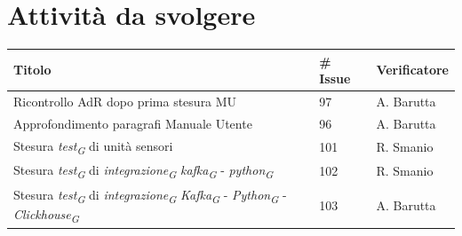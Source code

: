 \documentclass{article}
\begin{document}
    \section{Attività da svolgere}
    \begin{center}
        \begin{tabular}{|C{7cm}|C{1,5cm}|C{3cm}|}
            \hline
            \textbf{Titolo} & \textbf{\# Issue} & \textbf{Verificatore} \\
            \hline\hline
            Ricontrollo AdR dopo prima stesura MU & 97 & A. Barutta \\
            \hline
            Approfondimento paragrafi Manuale Utente & 96 & A. Barutta \\
            \hline
            Stesura \textit{test}\textsubscript{\textit{G}} di unità sensori & 101 & R. Smanio \\
            \hline
            Stesura \textit{test}\textsubscript{\textit{G}} di \textit{integrazione}\textsubscript{\textit{G}} \textit{kafka}\textsubscript{\textit{G}} - \textit{python}\textsubscript{\textit{G}} & 102 & R. Smanio \\
            \hline
            Stesura \textit{test}\textsubscript{\textit{G}} di \textit{integrazione}\textsubscript{\textit{G}} \textit{Kafka}\textsubscript{\textit{G}} - \textit{Python}\textsubscript{\textit{G}} - \textit{Clickhouse}\textsubscript{\textit{G}} & 103 & A. Barutta \\
            \hline
        \end{tabular}
    \end{center}
\end{document}

